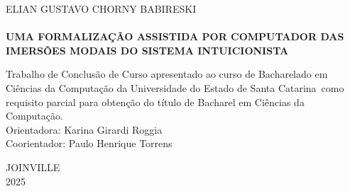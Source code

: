 \begin{titlepage}
    \begin{center}
        \textsf{ELIAN GUSTAVO CHORNY BABIRESKI} \\
         \\
        \vfill
        \textsf{\textbf{UMA FORMALIZAÇÃO ASSISTIDA POR COMPUTADOR DAS IMERSÕES MODAIS DO SISTEMA INTUICIONISTA}} \\
        \vfill
        \begin{flushright}
            \begin{minipage}{0.5\textwidth}
                \singlespacing
                
                \textsf{\noindent Trabalho de Conclusão de Curso apresentado ao curso de Bacharelado em Ciências da Computação da Universidade do Estado de Santa Catarina\ como requisito parcial para obtenção do título de Bacharel em Ciências da Computação.} \\

                \textsf{Orientadora: Karina Girardi Roggia} \\
                \textsf{Coorientador: Paulo Henrique Torrens}
            \end{minipage}
        \end{flushright}
        \vfill
        \textsf{JOINVILLE} \\
        \textsf{2025}
    \end{center}
\end{titlepage}